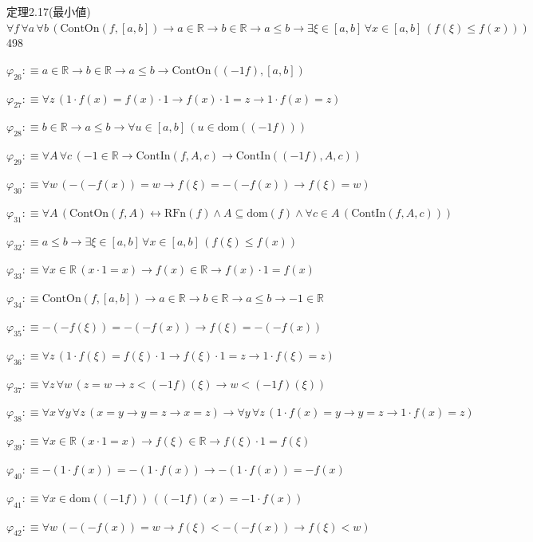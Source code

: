\begin{fullproof}{定理2.17(最小値)}{$\forall f\,\forall a\,\forall b\,(\mathrm{ContOn}(f,[a,b]) \to a \in \mathbb{R} \to b \in \mathbb{R} \to a \leq b \to \exists \xi \in [a,b]\,\forall x \in [a,b]\,(f(\xi) \leq f(x)))$}{498}
\begin{abbrevlist}
\item $\varphi_{26} :\equiv a \in \mathbb{R} \to b \in \mathbb{R} \to a \leq b \to \mathrm{ContOn}((-1 f),[a,b])$
\item $\varphi_{27} :\equiv \forall z\,(1 \cdot f(x) = f(x) \cdot 1 \to f(x) \cdot 1 = z \to 1 \cdot f(x) = z)$
\item $\varphi_{28} :\equiv b \in \mathbb{R} \to a \leq b \to \forall u \in [a,b]\,(u \in \mathrm{dom}((-1 f)))$
\item $\varphi_{29} :\equiv \forall A\,\forall c\,(-1 \in \mathbb{R} \to \mathrm{ContIn}(f,A,c) \to \mathrm{ContIn}((-1 f),A,c))$
\item $\varphi_{30} :\equiv \forall w\,(-(-f(x)) = w \to f(\xi) = -(-f(x)) \to f(\xi) = w)$
\item $\varphi_{31} :\equiv \forall A\,(\mathrm{ContOn}(f,A) \leftrightarrow \mathrm{RFn}(f) \land A \subseteq \mathrm{dom}(f) \land \forall c \in A\,(\mathrm{ContIn}(f,A,c)))$
\item $\varphi_{32} :\equiv a \leq b \to \exists \xi \in [a,b]\,\forall x \in [a,b]\,(f(\xi) \leq f(x))$
\item $\varphi_{33} :\equiv \forall x \in \mathbb{R}\,(x \cdot 1 = x) \to f(x) \in \mathbb{R} \to f(x) \cdot 1 = f(x)$
\item $\varphi_{34} :\equiv \mathrm{ContOn}(f,[a,b]) \to a \in \mathbb{R} \to b \in \mathbb{R} \to a \leq b \to -1 \in \mathbb{R}$
\item $\varphi_{35} :\equiv -(-f(\xi)) = -(-f(x)) \to f(\xi) = -(-f(x))$
\item $\varphi_{36} :\equiv \forall z\,(1 \cdot f(\xi) = f(\xi) \cdot 1 \to f(\xi) \cdot 1 = z \to 1 \cdot f(\xi) = z)$
\item $\varphi_{37} :\equiv \forall z\,\forall w\,(z = w \to z < (-1 f)(\xi) \to w < (-1 f)(\xi))$
\item $\varphi_{38} :\equiv \forall x\,\forall y\,\forall z\,(x = y \to y = z \to x = z) \to \forall y\,\forall z\,(1 \cdot f(x) = y \to y = z \to 1 \cdot f(x) = z)$
\item $\varphi_{39} :\equiv \forall x \in \mathbb{R}\,(x \cdot 1 = x) \to f(\xi) \in \mathbb{R} \to f(\xi) \cdot 1 = f(\xi)$
\item $\varphi_{40} :\equiv -(1 \cdot f(x)) = -(1 \cdot f(x)) \to -(1 \cdot f(x)) = -f(x)$
\item $\varphi_{41} :\equiv \forall x \in \mathrm{dom}((-1 f))\,((-1 f)(x) = -1 \cdot f(x))$
\item $\varphi_{42} :\equiv \forall w\,(-(-f(x)) = w \to f(\xi) < -(-f(x)) \to f(\xi) < w)$

\end{abbrevlist}
\end{fullproof}
